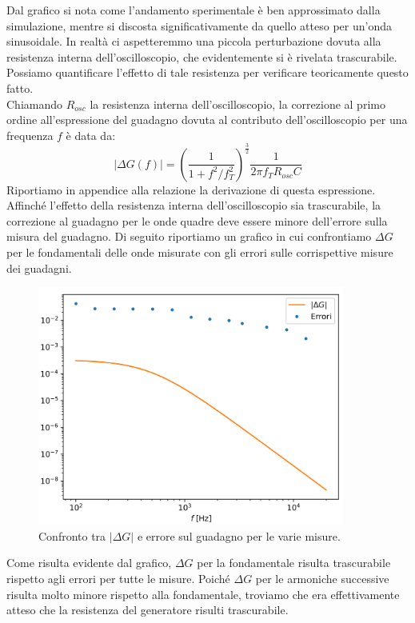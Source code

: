 \documentclass{article}[a4paper, oneside,11pt]
\begin{document}
    \noindent Dal grafico si nota come l'andamento sperimentale è ben approssimato dalla simulazione, mentre si discosta significativamente da quello atteso per un'onda sinusoidale. In realtà ci aspetteremmo una piccola perturbazione dovuta alla resistenza interna dell'oscilloscopio, che evidentemente si è rivelata trascurabile. Possiamo quantificare l'effetto di tale resistenza per verificare teoricamente questo fatto.\\
    Chiamando $R_{osc}$ la resistenza interna dell'oscilloscopio, la correzione al primo ordine all'espressione del guadagno dovuta al contributo dell'oscilloscopio per una frequenza $f$ è data da:
    \[|\Delta G(f)|= \left(\frac{1}{1+f^2/f_T^2}\right)^{\frac{3}{2}} \frac{1}{2\pi f_TR_{osc}C}\]
    Riportiamo in appendice alla relazione la derivazione di questa espressione.\\
    Affinché l'effetto della resistenza interna dell'oscilloscopio sia trascurabile, la correzione al guadagno per le onde quadre deve essere minore dell'errore sulla misura del guadagno. Di seguito riportiamo un grafico in cui confrontiamo $\Delta G$ per le fondamentali delle onde misurate con gli errori sulle corrispettive misure dei guadagni.

    \begin{figure}[H]
        \centering
        \includegraphics[width=0.90\textwidth]{img/correzione.png}
        \caption{Confronto tra $|\Delta G|$ e errore sul guadagno per le varie misure.}
    \end{figure}
    
    \noindent Come risulta evidente dal grafico, $\Delta G$ per la fondamentale risulta trascurabile rispetto agli errori per tutte le misure. Poiché $\Delta G$ per le armoniche successive risulta molto minore rispetto alla fondamentale, troviamo che era effettivamente atteso che la resistenza del generatore risulti trascurabile.
    
\end{document}
